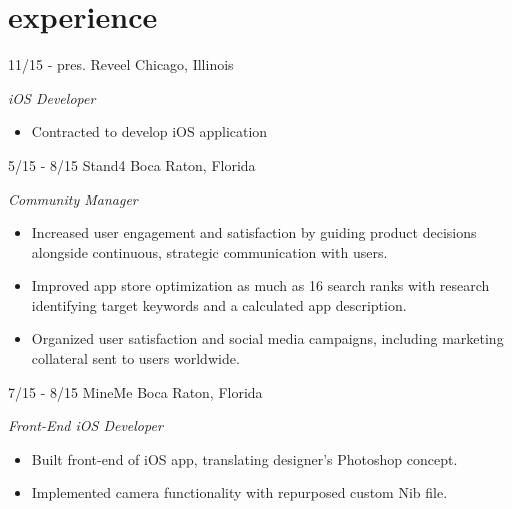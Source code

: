 \documentclass[print]{resume}
\begin{document}
\vspace{-20pt} %

\section{experience}
\begin{entrylist}

\entry
{11/15 - pres.}
{Reveel}
{Chicago, Illinois}
{
\emph{iOS Developer}
\begin{itemize}
    \item Contracted to develop iOS application 
\end{itemize} 
}

\entry
{5/15 - 8/15}
{Stand4}
{Boca Raton, Florida}
{
\emph{Community Manager}
\begin{itemize}
    \item Increased user engagement and satisfaction by guiding product decisions alongside continuous, strategic communication with users.
    \item Improved app store optimization as much as 16 search ranks with research identifying target keywords and a calculated app description.
    \item Organized user satisfaction and social media campaigns, including marketing collateral sent to users worldwide.
\end{itemize} 
}

\entry
{7/15 - 8/15}
{MineMe}
{Boca Raton, Florida}
{
\emph{Front-End iOS Developer}
\begin{itemize}
    \item Built front-end of iOS app, translating designer's Photoshop 
    concept.
	\item Implemented camera functionality with repurposed custom Nib file.
\end{itemize}
}


\end{entrylist}
\end{document}
